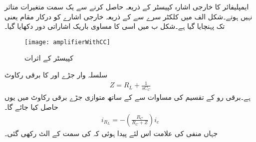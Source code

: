 


ایمپلیفائر کا خارجی اشارہ کپیسٹر  کے ذریعہ حاصل کرنے سے یک سمت متغیرات متاثر نہیں ہوتے۔شکل  الف میں کلکٹر  سرے سے  کے ذریعہ خارجی اشارے کو درکار مقام یعنی  تک پہنچایا گیا ہے۔شکل  ب میں اسی کا مساوی باریک اشاراتی دور دکھایا گیا۔
\begin{figure}
\centering
\texttt{[image: amplifierWithCC]}
\caption{کپیسٹر  کے اثرات}
\label{شکل_محاصل_کپیسٹر_کے_اثرات}
\end{figure}
سلسلہ وار جڑے  اور  کا برقی رکاوٹ 
\begin{align*}
Z=R_L+\frac{1}{s C_C}
\end{align*}
ہے۔برقی رو کے تقسیم کی مساوات سے  کے ساتھ متوازی جڑے برقی رکاوٹ  میں    یوں حاصل کیا جائے گا۔
\begin{align*}
i_{R_L}=-\left( \frac{R_C }{R_C+Z} \right) i_c
\end{align*}
جہاں منفی کی علامت اس لئے پیدا ہوئی کہ   کی سمت  کے الٹ رکھی گئی۔
	

